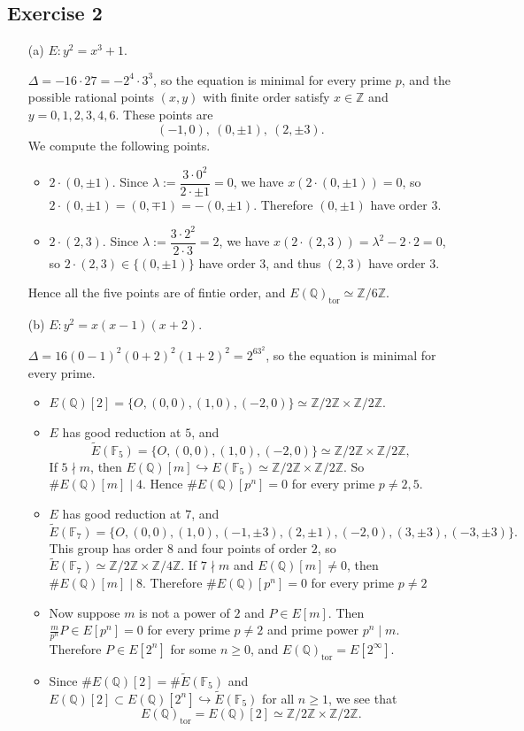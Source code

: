 \documentclass{article}
\theoremstyle{definition}
\theoremstyle{remark}
\newcommand{\Q}{\mathbb{Q}}
\newcommand{\Z}{\mathbb{Z}}
\newcommand{\F}{\mathbb{F}}
\newcommand{\tor}{\mathrm{tor}}
\begin{document}
\subsection*{Exercise 2}
\begin{enumerate}
    \item [(a)] $E : y^2 = x^3+1$.

    $\Delta = -16\cdot 27 = -2^4\cdot 3^3$,
    so the equation is minimal for every prime $p$,
    and the possible rational points $(x, y)$ with finite order satisfy $x\in\Z$ and $y = 0, 1, 2, 3, 4, 6$.
    These points are \[(-1, 0),\ (0, \pm 1),\ (2, \pm 3).\]
    We compute the following points.
    \begin{itemize}
        \item $2\cdot (0, \pm 1)$.
        Since $\lambda := \dfrac{3\cdot 0^2}{2\cdot \pm 1} = 0$, we have $x(2\cdot (0,\pm 1)) = 0$, so $2\cdot (0, \pm 1) = (0, \mp 1) = -(0, \pm 1)$.
        Therefore $(0, \pm 1)$ have order $3$.
        \item $2\cdot (2, 3)$.
        Since $\lambda := \dfrac{3\cdot 2^2}{2\cdot 3} = 2$, we have $x(2\cdot (2, 3)) = \lambda^2 - 2\cdot 2 = 0$, so $2\cdot (2, 3) \in \{(0, \pm 1)\}$ have order $3$, and thus $(2, 3)$ have order $3$.
    \end{itemize}
    Hence all the five points are of fintie order, and $E(\Q)_{\tor}\simeq \Z/6\Z$.

    \item [(b)] $E : y^2 = x(x-1)(x+2)$.

    $\Delta = 16(0 - 1)^2(0 + 2)^2(1+2)^2 = 2^63^2$, so the equation is minimal for every prime.
    \begin{itemize}
        \item $E(\Q)[2] = \{O, (0, 0), (1, 0), (-2, 0)\}\simeq\Z/2\Z\times\Z/2\Z$.
        \item $E$ has good reduction at $5$,
        and \[\tilde{E}(\F_5) = \{O, (0, 0), (1, 0), (-2, 0)\}\simeq\Z/2\Z\times\Z/2\Z,\]
        If $5\nmid m$, then $E(\Q)[m]\hookrightarrow E(\F_5)\simeq\Z/2\Z\times\Z/2\Z$.
        So $\# E(\Q)[m]\mid 4$. Hence $\# E(\Q)[p^n] = 0$ for every prime $p\ne 2, 5$.
        \item $E$ has good reduction at $7$,
        and \[\tilde{E}(\F_7) = \{O, (0, 0), (1, 0), (-1, \pm 3), (2, \pm1), (-2, 0), (3, \pm 3), (-3, \pm 3)\}.\]
        This group has order $8$ and four points of order $2$, so $\tilde{E}(\F_7)\simeq\Z/2\Z\times\Z/4\Z$.
        If $7\nmid m$ and $E(\Q)[m]\ne 0$, then $\# E(\Q)[m]\mid 8$.
        Therefore $\# E(\Q)[p^n] = 0$ for every prime $p\ne 2$
        \item Now suppose $m$ is not a power of $2$ and $P\in E[m]$.
        Then $\frac{m}{p^n}P\in E[p^n] = 0$ for every prime $p\ne 2$ and prime power $p^n\mid m$.
        Therefore $P\in E[2^n]$ for some $n\ge 0$,
        and $E(\Q)_\tor = E[2^\infty]$.
        \item Since $\# E(\Q)[2] = \# \tilde{E}(\F_5)$ and $E(\Q)[2]\subset E(\Q)[2^n]\hookrightarrow \tilde{E}(\F_5)$ for all $n\ge 1$, we see that \[E(\Q)_\tor = E(\Q)[2]\simeq \Z/2\Z\times\Z/2\Z.\]
    \end{itemize}


\end{enumerate}
\end{document}

